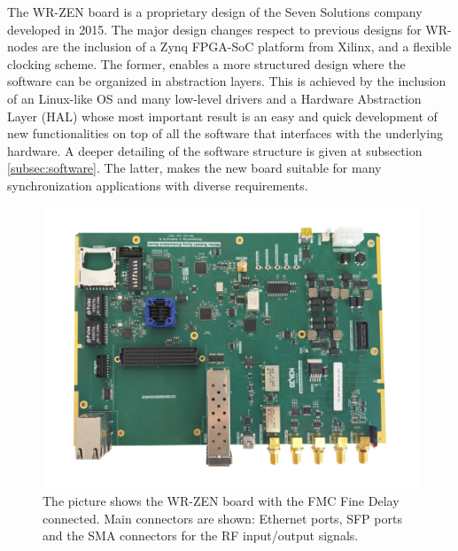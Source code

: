 The WR-ZEN board is a proprietary design of the Seven Solutions company 
developed in 2015. The major design changes respect to previous designs for 
WR-nodes are the inclusion of a Zynq FPGA-SoC platform from Xilinx, and a 
flexible clocking scheme. The former, enables a more structured design where 
the software can be organized in abstraction layers. This is achieved by the 
inclusion of an Linux-like OS and many low-level drivers and a Hardware 
Abstraction Layer (HAL) whose most important result is an easy and quick 
development of new functionalities on top of all the software that interfaces 
with the underlying hardware. A deeper detailing of the software structure is 
given at subsection \ref{subsec:software}. The latter, makes the new board 
suitable for many synchronization applications with diverse requirements.

\begin{figure}[H]
	\centering
	\includegraphics[width=0.7\linewidth]{img/wrzenv3_scaled}
	\caption[WR-ZEN board picture]{The picture shows the WR-ZEN board with the 
	FMC Fine Delay connected. Main connectors are shown: Ethernet ports, SFP 
	ports and the SMA connectors for the RF input/output signals.}
	\label{fig:wrzen}
\end{figure}

